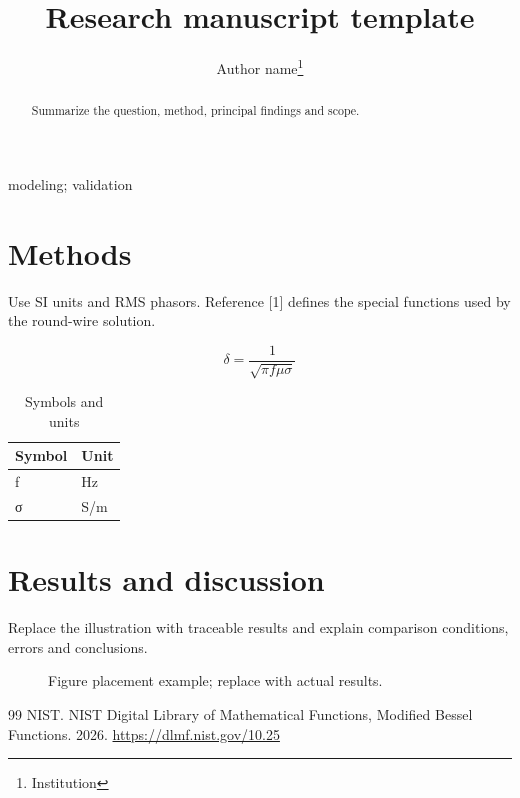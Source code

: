 \documentclass[journal,10pt]{IEEEtran}
\begin{document}
\title{Research manuscript template}
\author{Author name\thanks{Institution}}
\maketitle
\begin{abstract}
Summarize the question, method, principal findings and scope.
\end{abstract}
\begin{IEEEkeywords}
modeling; validation
\end{IEEEkeywords}
\section{Methods}
\hypertarget{chapter-01}{}
Use SI units and RMS phasors. Reference [1] defines the special functions used by the round-wire solution.

\begin{equation}\delta=\frac{1}{\sqrt{\pi f\mu\sigma}}\label{eq:skin}\end{equation}
\begin{table}[!htbp]
\centering
\caption{Symbols and units}
\begingroup\footnotesize
\begin{tabularx}{\textwidth}{>{\raggedright\arraybackslash}X>{\raggedright\arraybackslash}X}
\toprule
Symbol & Unit\\
\midrule
f & Hz\\
σ & S/m\\
\bottomrule
\end{tabularx}\endgroup
\end{table}
\section{Results and discussion}
\hypertarget{chapter-02}{}
Replace the illustration with traceable results and explain comparison conditions, errors and conclusions.

\renewcommand{\refname}{References}
\begin{figure}[!htbp]\centering\fbox{\rule{0pt}{22mm}\rule{.8\linewidth}{0pt}}\caption{Figure placement example; replace with actual results.}\label{fig:example}\end{figure}
\begin{thebibliography}{99}
 NIST. NIST Digital Library of Mathematical Functions, Modified Bessel Functions. 2026. \url{https://dlmf.nist.gov/10.25}
\end{thebibliography}
\end{document}
